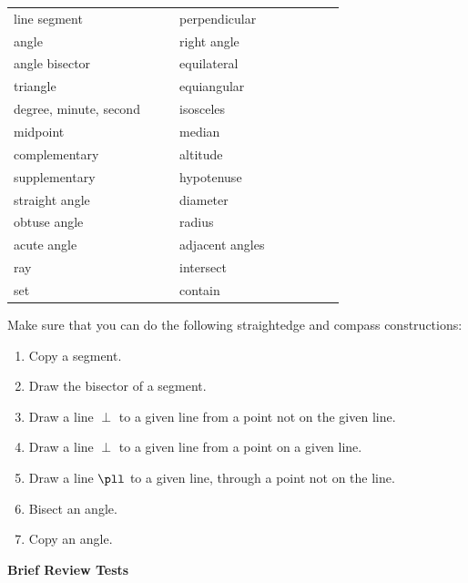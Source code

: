 \documentclass[11pt]{book}
\theoremstyle{bkplain}
\theoremstyle{XIplainnote}
\theoremstyle{bkplain}
\theoremstyle{bkplain}
\begin{document}
\begin{center}
\begin{tabular}{@{}p{0.42\linewidth}p{0.42\linewidth}@{}}
line segment            & perpendicular    \\
angle                   & right angle      \\
angle bisector          & equilateral      \\
triangle                & equiangular      \\
degree, minute, second  & isosceles        \\
midpoint                & median           \\
complementary           & altitude         \\
supplementary           & hypotenuse       \\
straight angle          & diameter         \\
obtuse angle            & radius           \\
acute angle             & adjacent angles  \\
ray                     & intersect        \\
set                     & contain          \\
\end{tabular}
\end{center}

\begin{exlist}\setcounter{exlisti}{1}
\item Make sure that you can do the following straightedge and compass
      constructions:
  \begin{enumerate}[label=(\alph*), leftmargin=2.2em, itemsep=1pt, topsep=2pt]
  \item Copy a segment.
  \item Draw the bisector of a segment.
  \item Draw a line $\perp$ to a given line from a point not on the given line.
  \item Draw a line $\perp$ to a given line from a point on a given line.
  \item Draw a line $\pll$ to a given line, through a point not on the line.
  \item Bisect an angle.
  \item Copy an angle.
  \end{enumerate}
\end{exlist}

\begin{center}\bfseries Brief Review Tests\end{center}
\nopagebreak
\end{document}
